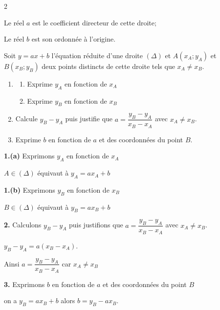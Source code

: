 \begin{multicols*}{2}
{  		 Le réel $a$ est le coefficient directeur de cette droite; 
  		
  		 Le réel $b$ est son ordonnée à l'origine.}
  	
  	Soit $y=ax+b$ l'équation réduite d'une droite $(\Delta)$ et $A(x_{A};y_{A})$ et $B(x_{B};y_{B})$ deux points distincts de cette droite tels que $x_{A}\neq x_{B}$. 
  	
  	\begin{enumerate}
  		\item 
  		\begin{enumerate}
  			\item Exprime $y_{A}$ en fonction de $x_{A}$ 
  			\item Exprime $y_{B}$ en fonction de $x_{B}$ 
  		\end{enumerate}
  		\item Calcule  $y_{B}- y_{A}$ puis justifie que $a=\dfrac{y_{B}- y_{A}}{x_{B}- x_{A}}$ avec $x_{A}\neq x_{B}$.
  		\item Exprime $b$ en fonction de $a$ et des coordonnées du point $B$.
  	\end{enumerate}
  	\dures 
  	\resul
  	\textbf{1.(a)} Exprimons $y_{A}$ en fonction de $x_{A}$
  	
  	$A\in(\Delta)$  équivaut à $y_{A}=ax_{A}+b$
  	
  	\textbf{1.(b)} Exprimons $y_{B}$ en fonction de $x_{B}$
  	
  	$B\in(\Delta)$  équivaut à $y_{B}=ax_{B}+b$
  	
  	\textbf{2.} Calculons  $y_{B}- y_{A}$ puis justifions que $a=\dfrac{y_{B}- y_{A}}{x_{B}- x_{A}}$ avec $x_{A}\neq x_{B}$.
  	
  	$y_{B}- y_{A}=a(x_{B}- x_{A})$.
  	
  	Ainsi $a=\dfrac{y_{B}- y_{A}}{x_{B}- x_{A}}$ car $x_{A}\neq x_{B}$
  	
  	\textbf{3.} Exprimons $b$ en fonction de $a$ et des coordonnées du point $B$
  	
  	on a $y_{B}=ax_{B}+b$ alors $b=y_{B}-ax_{B}$.\vspace{0.8cm}
  	
\end{multicols*}
